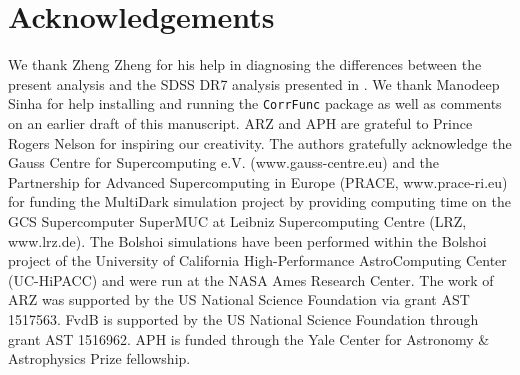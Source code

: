 \documentclass[usenatbib,usegraphicx,letterpaper]{mn2e}
\begin{document}
\section{Acknowledgements}
\label{section:acknowledgements}

We thank Zheng Zheng for his help in diagnosing the
differences between the present analysis and the SDSS DR7
analysis presented in \citet{zehavi_etal11}. We thank Manodeep 
Sinha for help installing and running the {\tt CorrFunc} package 
as well as comments on an earlier draft of this manuscript. ARZ and 
APH are grateful to Prince Rogers Nelson for inspiring our creativity. 
The authors gratefully acknowledge the Gauss Centre for Supercomputing
e.V. (www.gauss-centre.eu) and the Partnership for Advanced
Supercomputing in Europe (PRACE, www.prace-ri.eu) for funding the
MultiDark simulation project by providing computing time on the GCS
Supercomputer SuperMUC at Leibniz Supercomputing Centre (LRZ,
www.lrz.de). The Bolshoi simulations have been performed within the
Bolshoi project of the University of California High-Performance
AstroComputing Center (UC-HiPACC) and were run at the NASA Ames
Research Center. The work of ARZ was supported by the US National Science
Foundation via grant AST 1517563. FvdB is supported by the US National Science
Foundation through grant AST 1516962. APH is funded through the Yale Center 
for Astronomy \& Astrophysics Prize fellowship.




\end{document}
